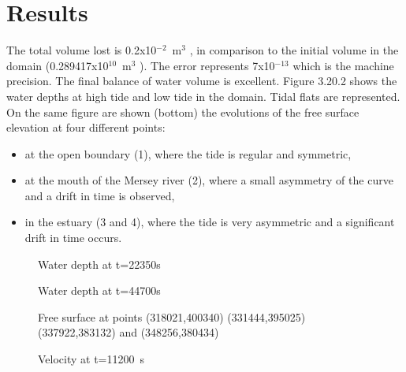 \section{Results}
The total volume lost is 0.2x10$^{-2}$~m$^3$ , in comparison to the initial volume in the domain (0.289417x10$^{10}$~m$^3$ ). The
error represents 7x10$^{-13}$ which is the machine precision. The final balance of water volume is excellent.
Figure 3.20.2 shows the water depths at high tide and low tide in the domain. Tidal flats are represented. On
the same figure are shown (bottom) the evolutions of the free surface elevation at four different points:
\begin{itemize}
\item at the open boundary (1), where the tide is regular and symmetric,
\item at the mouth of the Mersey river (2), where a small asymmetry of the curve and a drift in time is observed,
\item in the estuary (3 and 4), where the tide is very asymmetric and a significant drift in time occurs.
\end{itemize}


\begin{figure}[H]
 \centering
  \caption{Water depth at t=22350s}\label{fig:mersey:WD22}
\end{figure}

\begin{figure}[H]
 \centering
  \caption{Water depth at t=44700s}\label{fig:mersey:WD44}
\end{figure}

\begin{figure}[H]
 \centering
  \caption{Free surface at points (318021,400340) (331444,395025) (337922,383132) and (348256,380434)}\label{fig:mersey:WDTS}
\end{figure}

\begin{figure}[H]
 \centering
  \caption{Velocity at t=11200~s}\label{fig:mersey:Velocity}
\end{figure}
